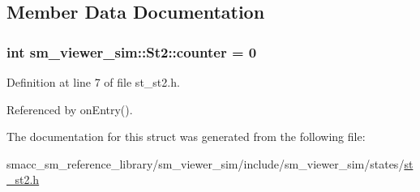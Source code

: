 \subsection{Member Data Documentation}
\subsubsection[{\texorpdfstring{counter}{counter}}]{\setlength{\rightskip}{0pt plus 5cm}int sm\+\_\+viewer\+\_\+sim\+::\+St2\+::counter = 0\hspace{0.3cm}{\ttfamily [static]}}\hypertarget{structsm__viewer__sim_1_1St2_ab488bf5ee92dbf4652b5b01830b37849}{}\label{structsm__viewer__sim_1_1St2_ab488bf5ee92dbf4652b5b01830b37849}


Definition at line 7 of file st\+\_\+st2.\+h.



Referenced by on\+Entry().



The documentation for this struct was generated from the following file\+:\begin{DoxyCompactItemize}
\item 
smacc\+\_\+sm\+\_\+reference\+\_\+library/sm\+\_\+viewer\+\_\+sim/include/sm\+\_\+viewer\+\_\+sim/states/\hyperlink{st__st2_8h}{st\+\_\+st2.\+h}\end{DoxyCompactItemize}
